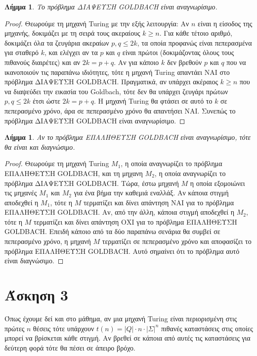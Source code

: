 \documentclass[a4paper, oneside, 11pt]{article}
\newtheorem{lm}[thm]{Λήμμα}
\theoremstyle{definition}
\begin{document}
\begin{lm}
Το πρόβλημα ΔΙΑΨΕΥΣΗ GOLDBACH είναι αναγνωρίσιμο.
\end{lm}
\begin{proof}
Θεωρούμε τη μηχανή Turing με την εξής λειτουργία: Αν $n$ είναι η είσοδος της μηχανής,
δοκιμάζει με τη σειρά τους ακεραίους $k\geq n$. Για κάθε τέτοιο αριθμό, δοκιμάζει όλα
τα ζευγάρια ακεραίων $p,q\leq 2k$, τα οποία προφανώς είναι πεπερασμένα για σταθερό $k$,
και ελέγχει αν τα $p$ και $q$ είναι πρώτοι (δοκιμάζοντας όλους τους πιθανούς διαιρέτες)
και αν $2k = p + q$. Αν για κάποιο $k$ δεν βρεθούν $p$ και $q$ που να ικανοποιούν τις
παραπάνω ιδιότητες, τότε η μηχανή Turing απαντάει ΝΑΙ στο πρόβλημα ΔΙΑΨΕΥΣΗ GOLDBACH.
Πραγματικά, αν υπάρχει ακέραιος $k\geq n$ που να διαψεύδει την εικασία του Goldbach,
τότε δεν θα υπάρχει ζευγάρι πρώτων $p,q\leq 2k$ έτσι ώστε $2k = p+q$. Η μηχανή Turing
θα φτάσει σε αυτό το $k$ σε πεπερασμένο χρόνο, άρα σε πεπερασμένο χρόνο θα απαντήσει
ΝΑΙ. Συνεπώς το πρόβλημα ΔΙΑΨΕΥΣΗ GOLDBACH είναι αναγνωρίσιμο.
\end{proof}

\begin{lm}
Αν το πρόβλημα ΕΠΑΛΗΘΕΥΣΗ GOLDBACH είναι αναγνωρίσιμο, τότε θα είναι και διαγνώσιμο.
\end{lm}
\begin{proof}
Θεωρούμε τη μηχανή Turing $M_1$, η οποία αναγνωρίζει το πρόβλημα ΕΠΑΛΗΘΕΥΣΗ GOLDBACH,
και τη μηχανη $M_2$, η οποία αναγνωρίζει το πρόβλημα ΔΙΑΨΕΥΣΗ GOLDBACH. Τώρα, έστω
μηχανή $M$ η οποία εξομοιώνει τις μηχανές $M_1$ και $M_2$ για ένα βήμα την
καθεμιά εναλλάξ. Αν κάποια στιγμή αποδεχθεί η $M_1$, τότε η $M$ τερματίζει και δίνει
απάντηση ΝΑΙ για το πρόβλημα ΕΠΑΛΗΘΕΥΣΗ GOLDBACH. Αν, από την άλλη, κάποια στιγμή
αποδεχθεί η $M_2$, τότε η $M$ τερματίζει και δίνει απάντηση ΟΧΙ για το πρόβλημα 
ΕΠΑΛΗΘΕΥΣΗ GOLDBACH. Επειδή κάποιο από τα δύο παραπάνω σενάρια θα συμβεί σε πεπερασμένο
χρόνο, η μηχανή $M$ τερματίζει σε πεπερασμένο χρόνο και αποφασίζει το πρόβλημα
ΕΠΑΛΗΘΕΥΣΗ GOLDBACH. Αυτό σημαίνει ότι το πρόβλημα αυτό είναι διαγνώσιμο.
\end{proof}

\section*{Άσκηση 3}

Όπως έχουμε δεί και στο μάθημα, αν μια μηχανή Turing είναι περιορισμένη στις πρώτες
$n$ θέσεις τότε υπάρχουν $t(n) = |Q| \cdot n \cdot |\Sigma|^n$ πιθανές καταστάσεις στις
οποίες μπορεί να βρίσκεται κάθε στιγμή. Αν βρεθεί σε κάποια από αυτές τις καταστάσεις
για δεύτερη φορά τότε θα πέσει σε άπειρο βρόχο.
\end{document}
